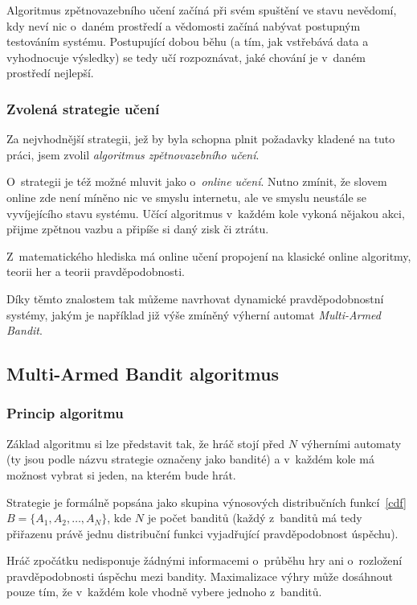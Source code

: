 \documentclass[thesis=M,czech]{FITthesis}[2014/05/07]
\begin{document}
Algoritmus zpětnovazebního učení začíná při svém spuštění ve stavu nevědomí, kdy neví nic o~daném prostředí a vědomosti začíná nabývat postupným testováním systému. Postupující dobou běhu (a tím, jak vstřebává data a vyhodnocuje výsledky) se tedy učí rozpoznávat, jaké chování je v~daném prostředí nejlepší.

\subsubsection{Zvolená strategie učení}
\label{sub:online}
Za nejvhodnější strategii, jež by byla schopna plnit požadavky kladené na tuto práci, jsem zvolil \emph{algoritmus zpětnovazebního učení}.

O~strategii je též možné mluvit jako o~\emph{online učení}. Nutno zmínit, že slovem online zde není míněno nic ve smyslu internetu, ale ve smyslu neustále se vyvíjejícího stavu systému. Učící algoritmus v~každém kole vykoná nějakou akci, přijme zpětnou vazbu a připíše si daný zisk či ztrátu.

Z~matematického hlediska má online učení propojení na klasické online algoritmy, teorii her a teorii pravděpodobnosti.

Díky těmto znalostem tak můžeme navrhovat dynamické pravděpodobnostní systémy, jakým je například již výše zmíněný výherní automat \emph{Multi-Armed Bandit}.

\subsection{Multi-Armed Bandit algoritmus}
\label{sec:multi}

\subsubsection{Princip algoritmu}
Základ algoritmu si lze představit tak, že hráč stojí před $N$ výherními automaty (ty jsou podle názvu strategie označeny jako bandité) a v~každém kole má možnost vybrat si jeden, na kterém bude hrát.

Strategie je formálně popsána jako skupina výnosových distribučních funkcí~\ref{cdf} $B = \{ A_1, A_2, \ldots, A_N \}$, kde $N$ je počet banditů (každý z~banditů má tedy přiřazenu právě jednu distribuční funkci vyjadřující pravděpodobnost úspěchu). 

Hráč zpočátku nedisponuje žádnými informacemi o~průběhu hry ani o~rozložení pravděpodobnosti úspěchu mezi bandity. Maximalizace výhry může dosáhnout pouze tím, že v~každém kole vhodně vybere jednoho z~banditů.
\end{document}
